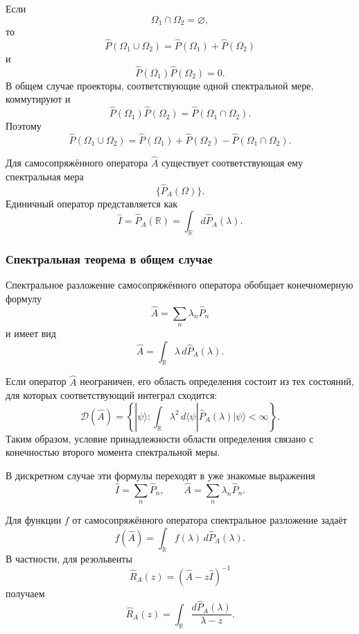 \documentclass[12pt,a4paper]{article}
\begin{document}
Если
\[
    \Omega_1\cap\Omega_2=\varnothing,
\]
то
\[
    \hat P(\Omega_1\cup\Omega_2)
    =
    \hat P(\Omega_1)+\hat P(\Omega_2)
\]
и
\[
    \boxed{
        \hat P(\Omega_1)\hat P(\Omega_2)=0
    }.
\]
В общем случае проекторы, соответствующие одной спектральной мере,
коммутируют и
\[
    \boxed{
        \hat P(\Omega_1)\hat P(\Omega_2)
        =
        \hat P(\Omega_1\cap\Omega_2)
    }.
\]
Поэтому
\[
    \hat P(\Omega_1\cup\Omega_2)
    =
    \hat P(\Omega_1)+\hat P(\Omega_2)
    -
    \hat P(\Omega_1\cap\Omega_2).
\]

Для самосопряжённого оператора $\hat A$ существует соответствующая ему
спектральная мера
\[
    \{\hat P_A(\Omega)\}.
\]
Единичный оператор представляется как
\[
    \boxed{
        \hat I
        =
        \hat P_A(\mathbb R)
        =
        \int_{\mathbb R}d\hat P_A(\lambda)
    }.
\]


\subsubsection{Спектральная теорема в общем случае}

Спектральное разложение самосопряжённого оператора обобщает конечномерную
формулу
\[
    \hat A=\sum_n\lambda_n\hat P_n
\]
и имеет вид
\[
    \boxed{
        \hat A
        =
        \int_{\mathbb R}
            \lambda\,d\hat P_A(\lambda)
    }.
\]

Если оператор $\hat A$ неограничен, его область определения состоит из
тех состояний, для которых соответствующий интеграл сходится:
\[
    \boxed{
    \mathcal D(\hat A)
    =
    \left\{
        |\psi\rangle:
        \int_{\mathbb R}
            \lambda^2\,
            d\langle\psi|
                \hat P_A(\lambda)
            |\psi\rangle
        <\infty
    \right\}
    }.
\]
Таким образом, условие принадлежности области определения связано с
конечностью второго момента спектральной меры.

В дискретном случае эти формулы переходят в уже знакомые выражения
\[
    \hat I=\sum_n\hat P_n,
    \qquad
    \hat A=\sum_n\lambda_n\hat P_n.
\]

Для функции $f$ от самосопряжённого оператора спектральное разложение
задаёт
\[
    \boxed{
        f(\hat A)
        =
        \int_{\mathbb R}
            f(\lambda)\,
            d\hat P_A(\lambda)
    }.
\]
В частности, для резольвенты
\[
    \hat R_A(z)
    =
    (\hat A-z\hat I)^{-1}
\]
получаем
\[
    \boxed{
        \hat R_A(z)
        =
        \int_{\mathbb R}
        \frac{d\hat P_A(\lambda)}
             {\lambda-z}
    }.
\]
\end{document}
